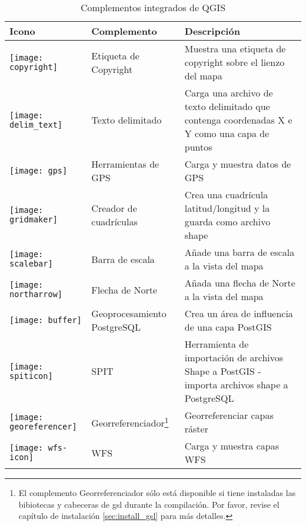 \begin{minipage}{\textwidth}
\begin{table}[H]
\centering
\caption{Complementos integrados de QGIS}\label{tab:core_plugins}\medskip
\small
 \begin{tabular}{|l|l|p{4in}|}
\hline \textbf{Icono} & \textbf{Complemento} & \textbf{Descripción} \\
\hline 
\texttt{[image: copyright]} & Etiqueta de Copyright \index{plugins!copyright}& Muestra una etiqueta de copyright sobre el lienzo del mapa\\
\hline 
\texttt{[image: delim\_text]} & Texto delimitado \index{plugins!delimited text}& Carga una archivo de texto delimitado que contenga coordenadas X e Y como una capa de puntos \\
\hline 
\texttt{[image: gps]} & Herramientas de GPS \index{plugins!gps}& Carga y muestra datos de GPS \\
\hline 
\texttt{[image: gridmaker]} & Creador de cuadrículas \index{plugins!graticule}& Crea una cuadrícula latitud/longitud y la guarda como archivo shape\\
\hline 
\texttt{[image: scalebar]} & Barra de escala \index{plugins!scalebar}& Añade una barra de escala a la vista del mapa\\
\hline 
\texttt{[image: northarrow]}& Flecha de Norte \index{plugins!north arrow}& Añada una flecha de Norte a la vista del mapa\\
\hline 
\texttt{[image: buffer]} & Geoprocesamiento PostgreSQL \index{plugins!geoprocessing}& Crea un área de influencia de una capa PostGIS \\
\hline 
\texttt{[image: spiticon]} & SPIT \index{plugins!SPIT}& Herramienta de importación de archivos Shape a PostGIS - importa archivos shape a PostgreSQL\\
\hline
\texttt{[image: georeferencer]} & Georreferenciador\footnote{El complemento Georreferenciador sólo está disponible si tiene instaladas las bibiotecas y cabeceras de gsl durante la compilación. Por favor, revise el capítulo de instalación \ref{sec:install_gsl} para más detalles.} \index{plugin!Georeferencer} & Georreferenciar capas ráster \\
\hline
\texttt{[image: wfs-icon]} & WFS & Carga y muestra capas WFS \\
\hline
\end{tabular}
\end{table}
\end{minipage}

